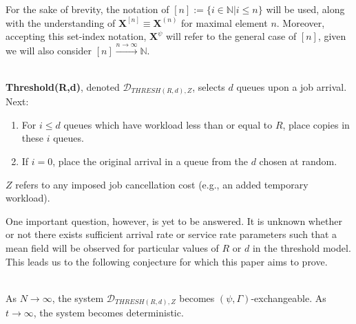 For the sake of brevity, the notation of $[n] := \{i \in \mathbb{N} | i \leq n\}$ will be used, along with the understanding of $\mathbf{X}^{[n]} \equiv \mathbf{X}^{(n)}$ for maximal element $n$.
Moreover, accepting this set-index notation, $\mathbf{X}^{\psi}$ will refer to the general case of $[n]$, given we will also consider $[n] \overset{n\rightarrow \infty}\longrightarrow \mathbb{N}$.

\begin{definition}[Threshold($R,d$)]
    \hfill \\
    \textbf{Threshold(R,d)}, denoted $\mathcal{D}_{THRESH(R,d),Z}$, selects $d$ queues upon a job arrival.
    Next:
    \begin{enumerate}
        \item For $i \leq d$ queues which have workload less than or equal to $R$, place copies in these $i$ queues.
        \item If $i=0$, place the original arrival in a queue from the $d$ chosen at random.
    \end{enumerate}
    $Z$ refers to any imposed job cancellation cost (e.g., an added temporary workload).
\end{definition}


One important question, however, is yet to be answered.
It is unknown whether or not there exists sufficient arrival rate or service rate parameters such that a mean field will be observed for particular values of $R$ or $d$ in the threshold model.
This leads us to the following conjecture for which this paper aims to prove.
\begin{conjecture}
    \hfill \\
    As $N \longrightarrow \infty$, the system $\mathcal{D}_{THRESH(R,d),Z}$ becomes $(\psi, \Gamma)$-exchangeable. As $t \longrightarrow \infty$, the system becomes deterministic.
    \label{conj}
\end{conjecture}


